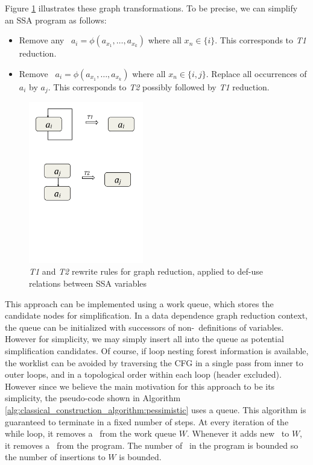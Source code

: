 Figure \ref{fig:t1t2transforms} illustrates these graph transformations.
To be precise, we can simplify an SSA program as follows:
\begin{itemize}
\item Remove any \phifun\ $a_i=\phi(a_{x_1},\ldots,a_{x_k})$ where all $x_n
  \in \{ i \}$. This corresponds to \emph{T1} reduction.
\item Remove \phifun\ $a_i=\phi(a_{x_1},\ldots,a_{x_k})$ where all
 $x_n \in \{ i, j \}$. Replace all occurrences of $a_i$ by $a_j$.
 This corresponds to \emph{T2} possibly followed by
 \emph{T1} reduction.
\end{itemize}

\begin{figure}
\includegraphics[width=5cm,trim=1cm 8cm 1cm 0cm]{t1_t2_transforms.pdf}
\caption{\label{fig:t1t2transforms}\emph{T1} and \emph{T2} rewrite
  rules for graph reduction, applied to def-use relations between SSA variables}
\end{figure}

This approach can be implemented using a work queue, 
which stores the candidate nodes for simplification.
In a data dependence graph reduction context, 
the queue can be initialized with
successors of non-\phifun\ definitions of variables.
However for simplicity, we may simply insert all \phifuns into the
queue
as potential simplification candidates.
Of course, if loop nesting forest
information is available, 
the worklist can be avoided by traversing the CFG in a single pass 
from inner to outer loops, and in a topological order within each loop (header excluded).
However since we believe the main motivation for this approach to be its
simplicity,
the pseudo-code shown in Algorithm 
\ref{alg:classical_construction_algorithm:pessimistic} uses a queue.
This algorithm is guaranteed to terminate in a fixed number of steps.
At every iteration of the while loop, it removes a \phifun\ from the
work queue
$W$. Whenever it adds new \phifuns\ to $W$, it removes a \phifun\ from
the program.
The number of \phifuns\ in 
the program is bounded so the number of insertions to $W$ is bounded.

